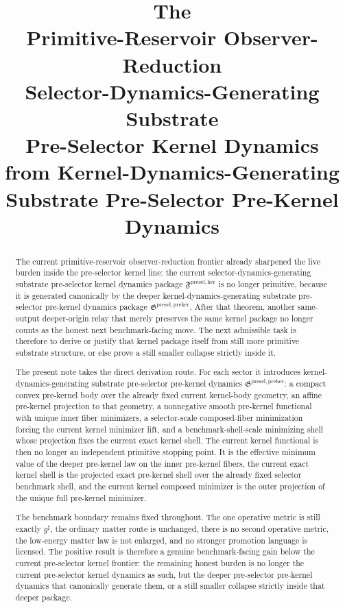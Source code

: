 \documentclass[11pt]{article}
\title{\textbf{The \TheoryName{}}\\[0.4em]
\large Primitive-Reservoir Observer-Reduction\\
\large Selector-Dynamics-Generating Substrate\\
\large Pre-Selector Kernel Dynamics\\
\large from Kernel-Dynamics-Generating\\
\large Substrate Pre-Selector Pre-Kernel Dynamics}
\author{}
\date{}
\newcommand{\CompletedMetric}{g^{\sharp}}
\newcommand{\KernelPackage}{\mathfrak F^{\mathrm{presel,ker}}}
\newcommand{\PreKernelPackage}{\mathfrak G^{\mathrm{presel,preker}}}
\begin{document}
\maketitle

\begin{abstract}
The current primitive-reservoir observer-reduction frontier already sharpened the live burden inside the pre-selector kernel line: the current selector-dynamics-generating substrate pre-selector kernel dynamics package \(\KernelPackage\) is no longer primitive, because it is generated canonically by the deeper kernel-dynamics-generating substrate pre-selector pre-kernel dynamics package \(\PreKernelPackage\). After that theorem, another same-output deeper-origin relay that merely preserves the same kernel package no longer counts as the honest next benchmark-facing move. The next admissible task is therefore to derive or justify that kernel package itself from still more primitive substrate structure, or else prove a still smaller collapse strictly inside it.

The present note takes the direct derivation route. For each sector it introduces kernel-dynamics-generating substrate pre-selector pre-kernel dynamics \(\PreKernelPackage\): a compact convex pre-kernel body over the already fixed current kernel-body geometry, an affine pre-kernel projection to that geometry, a nonnegative smooth pre-kernel functional with unique inner fiber minimizers, a selector-scale composed-fiber minimization forcing the current kernel minimizer lift, and a benchmark-shell-scale minimizing shell whose projection fixes the current exact kernel shell. The current kernel functional is then no longer an independent primitive stopping point. It is the effective minimum value of the deeper pre-kernel law on the inner pre-kernel fibers, the current exact kernel shell is the projected exact pre-kernel shell over the already fixed selector benchmark shell, and the current kernel composed minimizer is the outer projection of the unique full pre-kernel minimizer.

The benchmark boundary remains fixed throughout. The one operative metric is still exactly \(\CompletedMetric\), the ordinary matter route is unchanged, there is no second operative metric, the low-energy matter law is not enlarged, and no stronger promotion language is licensed. The positive result is therefore a genuine benchmark-facing gain below the current pre-selector kernel frontier: the remaining honest burden is no longer the current pre-selector kernel dynamics as such, but the deeper pre-selector pre-kernel dynamics that canonically generate them, or a still smaller collapse strictly inside that deeper package.
\end{abstract}
\end{document}
